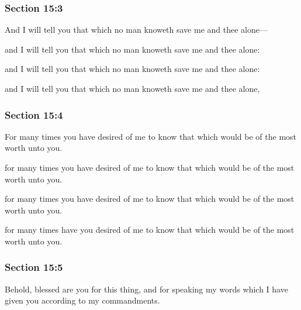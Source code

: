 	\subsubsection{Section 15:3} %
		\label{DC15-3}

		And I will tell you that which no man knoweth save me and thee alone---

		\begin{framed}
		\scriptsize
			\begin{compactdesc}
				\item[JSP] and I will tell you that which no man knoweth save me and thee alone: 
				\item[DC 1835] and I will tell you that which no man knoweth save me and thee alone: 
				\item[DC 1844] and I will tell you that which no man knoweth save me and thee alone, 
			\end{compactdesc}
		\end{framed}

	\subsubsection{Section 15:4} %
		\label{DC15-4}

		For many times you have desired of me to know that which would be of the most worth unto you.

		\begin{framed}
		\scriptsize
			\begin{compactdesc}
				\item[JSP] for many times you have desired of me to know that which would be of the most worth unto you.
				\item[DC 1835] for many times you have desired of me to know that which would be of the most worth unto you.
				\item[DC 1844] for many times have you desired of me to know that which would be of the most worth unto you.
			\end{compactdesc}
		\end{framed}

	\subsubsection{Section 15:5} %
		\label{DC15-5}

		Behold, blessed are you for this thing, and for speaking my words which I have given you according to my commandments.

